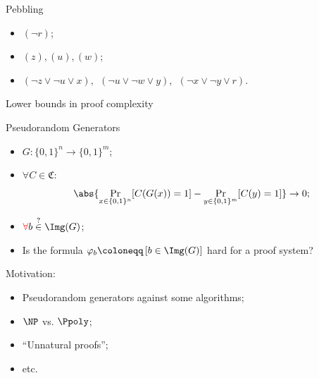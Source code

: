 \begin{frame}{Pebbling}

    \begin{center}
                
    \end{center}

    \pause
    \begin{itemize}
        \item $(\neg r)$;
            \pause
        \item $(z), (u), (w)$;
            \pause
        \item $(\neg z \lor \neg u \lor x), ~~ (\neg u \lor \neg w \lor y), ~~ (\neg x \lor \neg y \lor
            r)$.
    \end{itemize}

    \pause
    
\end{frame}

\begin{frame}{Lower bounds in proof complexity}

    
\end{frame}


\begin{frame}{Pseudorandom Generators}

    \begin{itemize}
        \item $G\colon \{0, 1\}^n \to \{0, 1\}^m$;
            \pause
        \item $\forall C \in \mathfrak{C}:$
            $$
                \abs{\Pr\limits_{x \in \{0, 1\}^n}[C(G(x)) = 1] -
                \Pr\limits_{y \in \{0, 1\}^m}[C(y) = 1]} \to 0;
            $$
            \pause
        \item $\textcolor{red}{\forall}b \stackrel{?}{\in} \Img(G)$;
            \pause
        \item Is the formula $\varphi_b \coloneqq \left[ b \in \Img(G) \right]$ hard for a proof system?
    \end{itemize}

    \pause
    \vspace{0.3cm}
    Motivation:
    \begin{itemize}
        \item Pseudorandom generators against some algorithms;
        \item $\NP$ vs. $\Ppoly$;
        \item ``Unnatural proofs'';
        \item etc. 
    \end{itemize}
\end{frame}


